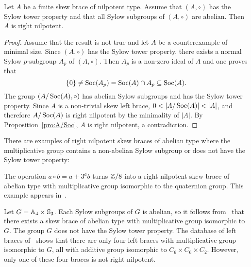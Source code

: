 \begin{corollary}
\label{cor:STP+abelian}
	Let $A$ be a finite skew brace of nilpotent type. Assume that 
	$(A,\circ)$ has the Sylow tower property and that 
	all Sylow subgroups of $(A,\circ)$ are abelian. 
	Then $A$ is right nilpotent.
\end{corollary}

\begin{proof}
    Assume that the result is not true and let $A$ be a counterexample of minimal size. 
    Since $(A,\circ)$ has the Sylow tower property, there exists a normal Sylow $p$-subgroup $A_p$ of $(A,\circ)$. Then $A_p$ is a non-zero ideal of $A$
    and one proves that 
    \[
    \{0\}\ne\operatorname{Soc}(A_p)=\operatorname{Soc}(A)\cap A_p\subseteq\operatorname{Soc}(A).
    \]
    The 
    group $(A/\operatorname{Soc}(A),\circ)$ has abelian Sylow subgroups 
    and has the Sylow tower property. Since $A$ is a non-trivial
    skew left brace, $0<|A/\Soc(A)|<|A|$, and therefore $A/\operatorname{Soc}(A)$ 
    is right nilpotent by the minimality of $|A|$. 
    By Proposition~\ref{pro:A/Soc}, $A$ is right nilpotent, a contradiction.
\end{proof}

There are examples of right nilpotent skew braces of abelian type where the multiplicative 
group contains a non-abelian Sylow subgroup or does not have the Sylow tower property:

\begin{example}
    The operation $a\circ b=a+3^ab$ turns $\mathbb{Z}/8$ into a right nilpotent skew brace of abelian type with multiplicative group isomorphic to the quaternion group. This example appears in~\cite{MR3320237}.
\end{example}

\begin{example}
    Let $G=\mathbb{A}_4\times\mathbb{S}_3$. Each Sylow subgroups of $G$ is abelian, so it follows from~\cite[Theorem 2.1]{cjo} that there exists a skew brace of abelian type with multiplicative group isomorphic to $G$. The group $G$ does not have the Sylow tower property. The database of left braces of~\cite{MR3647970} shows that there are only four left braces with multiplicative group isomorphic to $G$, all with additive group isomorphic to $C_6\times C_6\times C_2$. However, only one of these four braces is not right nilpotent. 
\end{example}


